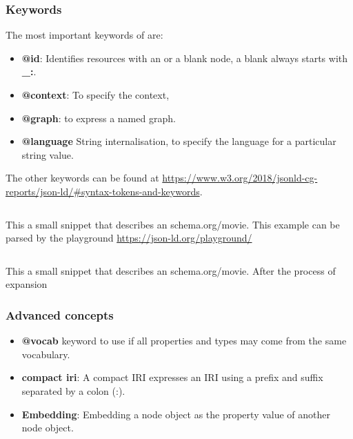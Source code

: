 \subsubsection{Keywords}
The most important keywords of  are:
\begin{itemize}
    \item \textbf{@id}: Identifies resources with an  or a blank node, a blank always starts with \textbf{\_:}.
    \item \textbf{@context}: To specify the context, 
    \item \textbf{@graph}: to express a named graph.
    \item \textbf{@language} String internalisation, to specify the language for a particular string value.
\end{itemize}
The other keywords can be found at \url{https://www.w3.org/2018/jsonld-cg-reports/json-ld/#syntax-tokens-and-keywords}.

\begin{listing}[H]
    \inputminted[linenos,frame=single]{JSON-LD}{code/shema_movie_example_sita_raman.jsonld}
    \caption{This a small  snippet that describes an schema.org/movie. This example can be parsed by the  playground \url{https://json-ld.org/playground/}}
    \label{code: example:jsonmovie}
\end{listing}

\begin{listing}[H]
    \inputminted[linenos,frame=single]{JSON-LD}{code/expanded_shema_movie.jsonld}
    \caption{This a small  snippet that describes an schema.org/movie. After the process of expansion}
    \label{code: example:jsonmovie:expanded}
\end{listing}

\subsubsection{Advanced concepts}
\begin{itemize}
    \item \textbf{@vocab} keyword to use if all properties and types may come from the same vocabulary.
    \item \textbf{compact iri}: A compact IRI expresses an IRI using a prefix and suffix separated by a colon (:).
    \item \textbf{Embedding}: Embedding a node object as the property value of another node object.
\end{itemize}

